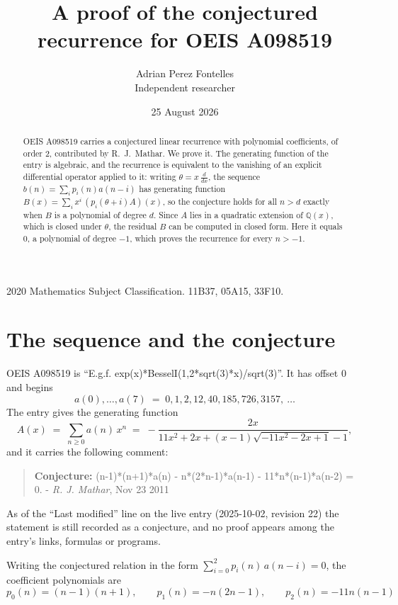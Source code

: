\documentclass[11pt,a4paper]{article}
\title{A proof of the conjectured recurrence for OEIS A098519}
\author{Adrian Perez Fontelles\\ \small Independent researcher}
\date{25 August 2026}
\theoremstyle{plain}
\theoremstyle{definition}
\begin{document}
\maketitle

\begin{abstract}
OEIS A098519 carries a conjectured linear recurrence with polynomial coefficients, of
order 2, contributed by R.~J.~Mathar. We prove it. The generating function of the
entry is algebraic, and the recurrence is equivalent to the vanishing of an explicit
differential operator applied to it: writing $\theta=x\,\frac{d}{dx}$, the sequence
$b(n)=\sum_{i}p_{i}(n)a(n-i)$ has generating function
$B(x)=\sum_{i}x^{i}\,(p_{i}(\theta+i)A)(x)$, so the conjecture holds for all $n>d$ exactly
when $B$ is a polynomial of degree $d$. Since $A$ lies in a quadratic extension of
$\mathbb{Q}(x)$, which is closed under $\theta$, the residual $B$ can be computed in
closed form. Here it equals $0$, a polynomial of degree $-1$, which proves
the recurrence for every $n>-1$.
\end{abstract}

\noindent\small 2020 Mathematics Subject Classification. 11B37, 05A15, 33F10.\normalsize

\section{The sequence and the conjecture}

OEIS A098519 is ``E.g.f. exp(x)*BesselI(1,2*sqrt(3)*x)/sqrt(3)''. It has offset $0$ and begins
\[
a(0),\dots,a(7)\;=\;0, 1, 2, 12, 40, 185, 726, 3157,\ \dots
\]
The entry gives the generating function
\begin{equation}\label{eq:gf}
A(x)\;=\;\sum_{n\ge 0} a(n)\,x^{n}\;=\;- \frac{2 x}{11 x^{2} + 2 x + \left(x - 1\right) \sqrt{- 11 x^{2} - 2 x + 1} - 1} ,
\end{equation}
and it carries the following comment:
\begin{quote}\small
\textbf{Conjecture:} (n-1)*(n+1)*a(n) - n*(2*n-1)*a(n-1) - 11*n*(n-1)*a(n-2) = 0. - \emph{R. J. Mathar}, Nov 23 2011
\end{quote}
As of the ``Last modified'' line on the live entry (2025-10-02, revision 22) the
statement is still recorded as a conjecture, and no proof appears among the entry's links,
formulas or programs.

Writing the conjectured relation in the form $\sum_{i=0}^{2}p_{i}(n)\,a(n-i)=0$,
the coefficient polynomials are
\[
p_{0}(n)=\left(n - 1\right) \left(n + 1\right),\qquad p_{1}(n)=- n \left(2 n - 1\right),\qquad p_{2}(n)=- 11 n \left(n - 1\right)
\]
\end{document}
